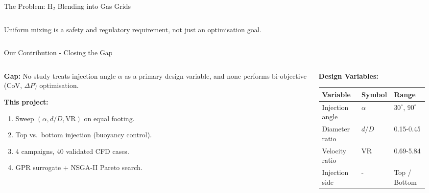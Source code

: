 \documentclass[10pt, aspectratio=169]{beamer}
\begin{document}
\begin{frame}{The Problem: H\texorpdfstring{$_2$}{2} Blending into Gas Grids}
\begin{columns}[T]
\begin{column}{0.42\textwidth}
            \vspace{0.3em}
            {\small Uniform mixing is a safety and regulatory
            requirement, not just an optimisation goal.}
        \end{column}
    \end{columns}
\end{frame}

\begin{frame}{Our Contribution - Closing the Gap}
    \begin{columns}[T]
        \begin{column}{0.50\textwidth}
            \alert{\textbf{Gap:} No study treats injection angle
            $\alpha$ as a primary design variable, and none performs
            bi-objective (CoV, $\Delta P$) optimisation.}

            \vspace{0.6em}
            \textbf{This project:}
            \begin{enumerate}
                \item Sweep $(\alpha, d/D, \text{VR})$ on equal footing.
                \item Top vs.\ bottom injection (buoyancy control).
                \item 4 campaigns, 40 validated CFD cases.
                \item GPR surrogate + NSGA-II Pareto search.
            \end{enumerate}
        \end{column}
        \begin{column}{0.47\textwidth}
            \vspace{0.5em}
            \textbf{Design Variables:}
            \begin{table}
                \centering\scriptsize
                \begin{tabular}{@{}lll@{}}
                    \toprule
                    \textbf{Variable} & \textbf{Symbol} & \textbf{Range} \\
                    \midrule
                    Injection angle & $\alpha$ & $30^\circ$, $90^\circ$ \\
                    Diameter ratio & $d/D$ & 0.15-0.45 \\
                    Velocity ratio & VR & 0.69-5.84 \\
                    Injection side & - & Top / Bottom \\
                    \bottomrule
                \end{tabular}
            \end{table}


\end{column}
\end{columns}
\end{frame}
\end{document}
